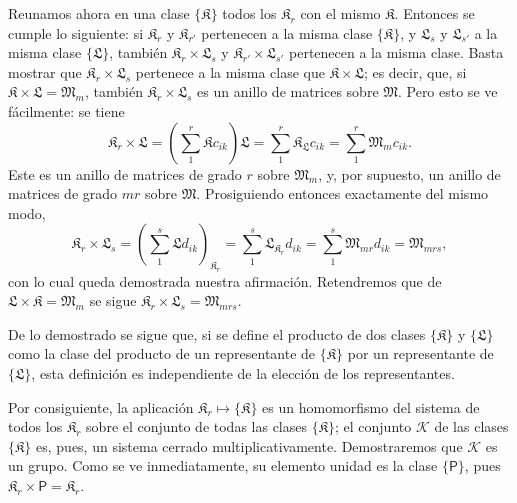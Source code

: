 Reunamos ahora en una clase \(\{\mathfrak K\}\) todos los \(\mathfrak K_r\) con el mismo \(\mathfrak K\). Entonces se cumple lo siguiente: si \(\mathfrak K_r\) y \(\mathfrak K_{r'}\) pertenecen a la misma clase \(\{\mathfrak K\}\), y \(\mathfrak L_s\) y \(\mathfrak L_{s'}\) a la misma clase \(\{\mathfrak L\}\), también \(\mathfrak K_r\times\mathfrak L_s\) y \(\mathfrak K_{r'}\times\mathfrak L_{s'}\) pertenecen a la misma clase. Basta mostrar que \(\mathfrak K_r\times\mathfrak L_s\) pertenece a la misma clase que \(\mathfrak K\times\mathfrak L\); es decir, que, si \(\mathfrak K\times\mathfrak L=\mathfrak M_m\), también \(\mathfrak K_r\times\mathfrak L_s\) es un anillo de matrices sobre \(\mathfrak M\). Pero esto se ve fácilmente: se tiene
\[
\mathfrak K_r\times\mathfrak L
=\left(\sum_1^r\mathfrak K c_{ik}\right)\mathfrak L
=\sum_1^r\mathfrak K_{\mathfrak L}c_{ik}
=\sum_1^r\mathfrak M_m c_{ik}.
\]
Este es un anillo de matrices de grado \(r\) sobre \(\mathfrak M_m\), y, por supuesto, un anillo de matrices de grado \(mr\) sobre \(\mathfrak M\). Prosiguiendo entonces exactamente del mismo modo,
\[
\mathfrak K_r\times\mathfrak L_s
=\left(\sum_1^s\mathfrak L d_{ik}\right)_{\mathfrak K_r}
=\sum_1^s\mathfrak L_{\mathfrak K_r}d_{ik}
=\sum_1^s\mathfrak M_{mr}d_{ik}
=\mathfrak M_{mrs},
\]
con lo cual queda demostrada nuestra afirmación. Retendremos que de \(\mathfrak L\times\mathfrak K=\mathfrak M_m\) se sigue \(\mathfrak K_r\times\mathfrak L_s=\mathfrak M_{mrs}\).

De lo demostrado se sigue que, si se define el producto de dos clases \(\{\mathfrak K\}\) y \(\{\mathfrak L\}\) como la clase del producto de un representante de \(\{\mathfrak K\}\) por un representante de \(\{\mathfrak L\}\), esta definición es independiente de la elección de los representantes.

Por consiguiente, la aplicación \(\mathfrak K_r\mapsto\{\mathfrak K\}\) es un homomorfismo del sistema de todos los \(\mathfrak K_r\) sobre el conjunto de todas las clases \(\{\mathfrak K\}\); el conjunto \(\mathscr K\) de las clases \(\{\mathfrak K\}\) es, pues, un sistema cerrado multiplicativamente. Demostraremos que \(\mathscr K\) es un grupo. Como se ve inmediatamente, su elemento unidad es la clase \(\{\mathsf P\}\), pues \(\mathfrak K_r\times\mathsf P=\mathfrak K_r\).

